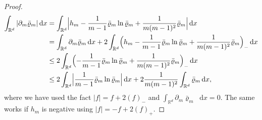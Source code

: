 \documentclass[10pt]{amsart}
\newcommand{\dx}[1]{\mathop{}\!\mathrm{d} #1}
\newcommand{\R}{\mathbb{R}}
\theoremstyle{plain}
\theoremstyle{remark}
\begin{document}
\begin{proof}
\begin{equation}\label{dmrho}
\begin{split} \int_{\R^d} |\partial_m \bar\varrho_m| \dx x &= \int_{\R^d} \Bigl |h_m - \frac{1}{m-1}\bar\varrho_m \ln \bar\varrho_m + \frac{1}{m(m-1)^2}\bar\varrho_m \Bigr| \dx x\\
&= \int_{\R^d}\partial_m \bar\varrho_m \dx x + 2\int_{\R^d} \Bigl(h_m - \frac{1}{m-1}\bar\varrho_m \ln \bar\varrho_m + \frac{1}{m(m-1)^2}\bar\varrho_m \Bigr)_- \dx x \\
&\leq 2 \int_{\R^d} \Bigl(- \frac{1}{m-1}\bar\varrho_m \ln \bar\varrho_m + \frac{1}{m(m-1)^2}\bar\varrho_m \Bigr)_- \dx x \\
&\leq 2 \int_{\R^d} \Bigl|\frac{1}{m-1}\bar\varrho_m \ln \bar\varrho_m \Bigr| \dx x + 2 \frac{1}{m(m-1)^2}\int_{\R^d}\bar\varrho_m \dx x,
\end{split}
\end{equation}
where we have used the fact $|f| = f + 2 (f)_-$ and $\int_{\R^d}\partial_m \bar\varrho_m \dx x=0$. The same works if $h_m$ is negative using $|f|=-f +2 (f)_+$.


\end{proof}
\end{document}
